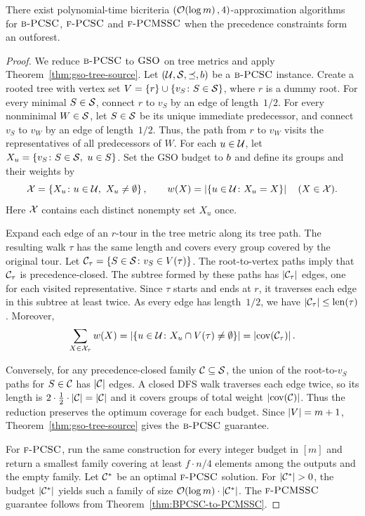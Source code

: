\begin{theorem}\label{thm:BPCSC-outforest}
    \setlength{\emergencystretch}{2em}
    There exist polynomial-time bicriteria $\mathopen{}\left( \mathcal{O}\mathopen{}\left( \log m \right), 4 \right)$-approximation algorithms for $\textup{\textsc{b-PCSC}}$,  $\textup{\textsc{f-PCSC}}$ and $\textup{\textsc{f-PCMSSC}}$ when the precedence constraints form an outforest.
\end{theorem}
\begin{proof}
    We reduce $\textup{\textsc{b-PCSC}}$ to $\textup{\textsc{GSO}}$ on tree metrics and apply Theorem~\ref{thm:gso-tree-source}. Let $(\mathcal{U},\mathcal{S},\preceq,b)$ be a $\textup{\textsc{b-PCSC}}$ instance.
    Create a rooted tree with vertex set $V=\mathopen{}\left\{ r \right\}\cup\mathopen{}\left\{ v_S\colon S\in\mathcal{S} \right\}$, where $r$ is a dummy root. For every minimal $S\in\mathcal{S}$, connect $r$ to $v_S$ by an edge of length~$1/2$. For every nonminimal $W\in\mathcal{S}$, let $S\in\mathcal{S}$ be its unique immediate predecessor, and connect $v_S$ to $v_W$ by an edge of length~$1/2$. Thus, the path from $r$ to $v_W$ visits the representatives of all predecessors of $W$. For each $u\in\mathcal{U}$, let $X_u=\mathopen{}\left\{ v_S\colon S\in\mathcal{S},\ u\in S \right\}$. Set the GSO budget to $b$ and define its groups and their weights by
    \[
        \mathcal{X}=\mathopen{}\left\{ X_u\colon u\in\mathcal{U},\ X_u\neq\emptyset \right\},
        \qquad w(X)=\mathopen{}\left| \mathopen{}\left\{ u\in\mathcal{U}\colon X_u=X \right\} \right|\quad(X\in\mathcal{X}).
    \]
    Here $\mathcal{X}$ contains each distinct nonempty set $X_u$ once.

    Expand each edge of an $r$-tour in the tree metric along its tree path. The resulting walk $\tau$ has the same length and covers every group covered by the original tour. Let $\mathcal{C}_\tau=\mathopen{}\left\{ S\in\mathcal{S}\colon v_S\in V(\tau) \right\}$. The root-to-vertex paths imply that $\mathcal{C}_\tau$ is precedence-closed. The subtree formed by these paths has $\mathopen{}\left| \mathcal{C}_\tau \right|$ edges, one for each visited representative. Since $\tau$ starts and ends at $r$, it traverses each edge in this subtree at least twice. As every edge has length~$1/2$, we have $\mathopen{}\left| \mathcal{C}_\tau \right|\leq\operatorname{len}\mathopen{}\left( \tau \right)$. Moreover,
    \[
        \sum_{X\in\mathcal{X}_\tau}w(X)
        =\mathopen{}\left| \mathopen{}\left\{ u\in\mathcal{U}\colon X_u\cap V(\tau)\neq\emptyset \right\} \right|
        =\mathopen{}\left| \operatorname{cov}\mathopen{}\left( \mathcal{C}_\tau \right) \right|.
    \]

    Conversely, for any precedence-closed family $\mathcal{C}\subseteq\mathcal{S}$, the union of the root-to-$v_S$ paths for $S\in\mathcal{C}$ has $\mathopen{}\left| \mathcal{C} \right|$ edges. A closed DFS walk traverses each edge twice, so its length is $2\cdot\frac12\cdot\mathopen{}\left| \mathcal{C} \right|=\mathopen{}\left| \mathcal{C} \right|$ and it covers groups of total weight $\mathopen{}\left| \operatorname{cov}\mathopen{}\left( \mathcal{C} \right) \right|$. Thus the reduction preserves the optimum coverage for each budget. Since $\mathopen{}\left| V \right|=m+1$, Theorem~\ref{thm:gso-tree-source} gives the $\textup{\textsc{b-PCSC}}$ guarantee.

    For $\textup{\textsc{f-PCSC}}$, run the same construction for every integer budget in $[m]$ and return a smallest family covering at least $f\cdot n/4$ elements among the outputs and the empty family. Let $\mathcal{C}^{*}$ be an optimal $\textup{\textsc{f-PCSC}}$ solution. For $\spr{\cCopt}>0$, the budget $\mathopen{}\left| \mathcal{C}^{*} \right|$ yields such a family of size $\mathcal{O}\mathopen{}\left( \log m \right)\cdot\mathopen{}\left| \mathcal{C}^{*} \right|$. The $\textup{\textsc{f-PCMSSC}}$ guarantee follows from Theorem~\ref{thm:BPCSC-to-PCMSSC}.
\end{proof}


